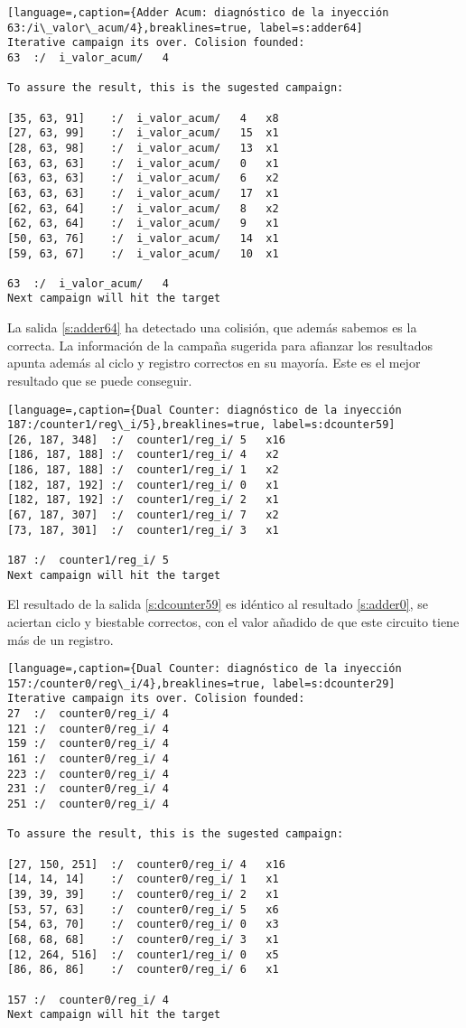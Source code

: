 \begin{lstlisting}[language=,caption={Adder Acum: diagnóstico de la inyección
63:/i\_valor\_acum/4},breaklines=true, label=s:adder64]
Iterative campaign its over. Colision founded:
63	:/	i_valor_acum/	4

To assure the result, this is the sugested campaign:

[35, 63, 91]	:/	i_valor_acum/	4	x8
[27, 63, 99]	:/	i_valor_acum/	15	x1
[28, 63, 98]	:/	i_valor_acum/	13	x1
[63, 63, 63]	:/	i_valor_acum/	0	x1
[63, 63, 63]	:/	i_valor_acum/	6	x2
[63, 63, 63]	:/	i_valor_acum/	17	x1
[62, 63, 64]	:/	i_valor_acum/	8	x2
[62, 63, 64]	:/	i_valor_acum/	9	x1
[50, 63, 76]	:/	i_valor_acum/	14	x1
[59, 63, 67]	:/	i_valor_acum/	10	x1

63	:/	i_valor_acum/	4
Next campaign will hit the target
\end{lstlisting}

La salida \ref{s:adder64} ha detectado una colisión, que además sabemos es la
correcta. La información de la campaña sugerida para afianzar los resultados
apunta además al ciclo y registro correctos en su mayoría. Este es el mejor
resultado que se puede conseguir.

\begin{lstlisting}[language=,caption={Dual Counter: diagnóstico de la inyección
187:/counter1/reg\_i/5},breaklines=true, label=s:dcounter59]
[26, 187, 348]	:/	counter1/reg_i/	5	x16
[186, 187, 188]	:/	counter1/reg_i/	4	x2
[186, 187, 188]	:/	counter1/reg_i/	1	x2
[182, 187, 192]	:/	counter1/reg_i/	0	x1
[182, 187, 192]	:/	counter1/reg_i/	2	x1
[67, 187, 307]	:/	counter1/reg_i/	7	x2
[73, 187, 301]	:/	counter1/reg_i/	3	x1

187	:/	counter1/reg_i/	5
Next campaign will hit the target
\end{lstlisting}

El resultado de la salida \ref{s:dcounter59} es idéntico al resultado
\ref{s:adder0}, se aciertan ciclo y biestable correctos, con el valor añadido de
que este circuito tiene más de un registro.

\begin{lstlisting}[language=,caption={Dual Counter: diagnóstico de la inyección
157:/counter0/reg\_i/4},breaklines=true, label=s:dcounter29]
Iterative campaign its over. Colision founded:
27	:/	counter0/reg_i/	4
121	:/	counter0/reg_i/	4
159	:/	counter0/reg_i/	4
161	:/	counter0/reg_i/	4
223	:/	counter0/reg_i/	4
231	:/	counter0/reg_i/	4
251	:/	counter0/reg_i/	4

To assure the result, this is the sugested campaign:

[27, 150, 251]	:/	counter0/reg_i/	4	x16
[14, 14, 14]	:/	counter0/reg_i/	1	x1
[39, 39, 39]	:/	counter0/reg_i/	2	x1
[53, 57, 63]	:/	counter0/reg_i/	5	x6
[54, 63, 70]	:/	counter0/reg_i/	0	x3
[68, 68, 68]	:/	counter0/reg_i/	3	x1
[12, 264, 516]	:/	counter1/reg_i/	0	x5
[86, 86, 86]	:/	counter0/reg_i/	6	x1

157	:/	counter0/reg_i/	4
Next campaign will hit the target
\end{lstlisting}

